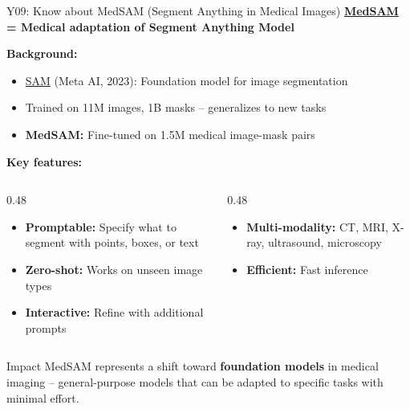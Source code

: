 \documentclass[aspectratio=169, 10pt]{beamer}
\begin{document}
\begin{frame}{Y09: Know about MedSAM (Segment Anything in Medical Images)}
    \textbf{\href{https://www.nature.com/articles/s41467-024-44824-z}{MedSAM} = Medical adaptation of Segment Anything Model}
    
    \vspace{0.2cm}
    \textbf{Background:}
    \begin{itemize}
        \item \href{https://segment-anything.com/}{SAM} (Meta AI, 2023): Foundation model for image segmentation
        \item Trained on 11M images, 1B masks -- generalizes to new tasks
        \item \textbf{MedSAM:} Fine-tuned on 1.5M medical image-mask pairs
    \end{itemize}
    
    \vspace{0.2cm}
    \textbf{Key features:}
    \begin{columns}[T]
        \begin{column}{0.48\textwidth}
            \begin{itemize}
                \item \textbf{Promptable:} Specify what to segment with points, boxes, or text
                \item \textbf{Zero-shot:} Works on unseen image types
                \item \textbf{Interactive:} Refine with additional prompts
            \end{itemize}
        \end{column}
        \begin{column}{0.48\textwidth}
            \begin{itemize}
                \item \textbf{Multi-modality:} CT, MRI, X-ray, ultrasound, microscopy
                \item \textbf{Efficient:} Fast inference
            \end{itemize}
        \end{column}
    \end{columns}
    
    \vspace{0.2cm}
    \begin{block}{Impact}
        MedSAM represents a shift toward \textbf{foundation models} in medical imaging -- general-purpose models that can be adapted to specific tasks with minimal effort.
    \end{block}
\end{frame}
\end{document}
